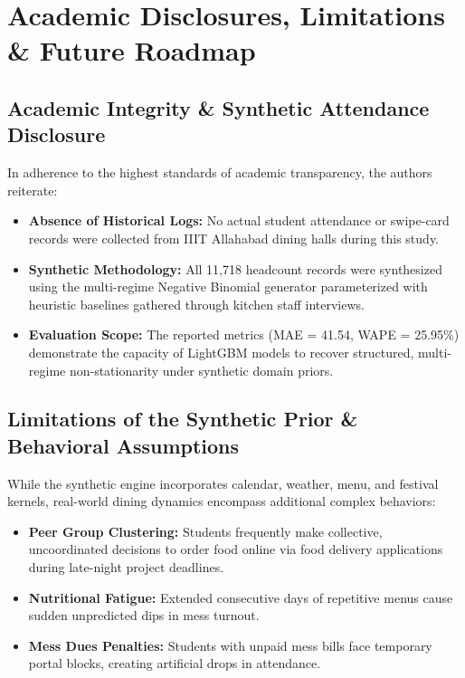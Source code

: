 \documentclass[11pt,a4paper,oneside]{report}
\begin{document}
\chapter{Academic Disclosures, Limitations \& Future Roadmap}

\section{Academic Integrity \& Synthetic Attendance Disclosure}
In adherence to the highest standards of academic transparency, the authors reiterate:
\begin{itemize}
  \item \textbf{Absence of Historical Logs:} No actual student attendance or swipe-card records were collected from IIIT Allahabad dining halls during this study.
  \item \textbf{Synthetic Methodology:} All 11,718 headcount records were synthesized using the multi-regime Negative Binomial generator parameterized with heuristic baselines gathered through kitchen staff interviews.
  \item \textbf{Evaluation Scope:} The reported metrics (MAE = 41.54, WAPE = 25.95\%) demonstrate the capacity of LightGBM models to recover structured, multi-regime non-stationarity under synthetic domain priors.
\end{itemize}

\section{Limitations of the Synthetic Prior \& Behavioral Assumptions}
While the synthetic engine incorporates calendar, weather, menu, and festival kernels, real-world dining dynamics encompass additional complex behaviors:
\begin{itemize}
  \item \textbf{Peer Group Clustering:} Students frequently make collective, uncoordinated decisions to order food online via food delivery applications during late-night project deadlines.
  \item \textbf{Nutritional Fatigue:} Extended consecutive days of repetitive menus cause sudden unpredicted dips in mess turnout.
  \item \textbf{Mess Dues Penalties:} Students with unpaid mess bills face temporary portal blocks, creating artificial drops in attendance.
\end{itemize}
\end{document}

